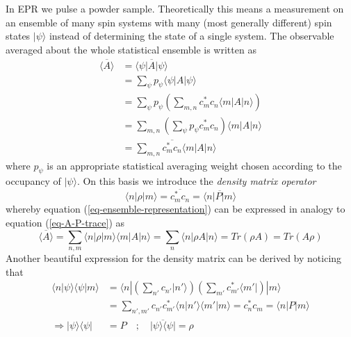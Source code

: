 \documentclass[11.5pt,a4paper]{article}
\begin{document}
In EPR we pulse a powder sample. Theoretically this means a measurement on an ensemble of many spin systems with many (most generally different) spin states $|\psi\rangle$ instead of determining the state of a single system. The observable averaged about the whole statistical ensemble is written as
\begin{align}
 \overline{\langle A \rangle} & = \overline{\langle \psi | A | \psi \rangle} \\
  & = \sum_\psi p_\psi \langle \psi | A | \psi \rangle \\ 
  & = \sum_\psi p_\psi \left( \sum_{m,n} c_m^* c_n \langle m | A | n \rangle \right) \\
  & = \sum_{m,n} \left( \sum_\psi p_\psi c_m^* c_n \right) \langle m | A | n \rangle \\
  & = \sum_{m,n} \overline{c_m^* c_n} \langle m | A | n \rangle
  \label{eq-ensemble-representation}
\end{align}
where $p_\psi$ is an appropriate statistical averaging weight chosen according to the occupancy of $|\psi\rangle$. On this basis we introduce the \emph{density matrix operator}
\begin{equation} 
 \langle n | \rho | m \rangle = \overline{c_m^* c_n} = \overline{\langle n | P | m \rangle}
\end{equation}
whereby equation (\ref{eq-ensemble-representation}) can be expressed in analogy to equation (\ref{eq-A-P-trace}) as
\begin{equation}
 \overline{\langle A \rangle} = \sum_{n,m} \langle n | \rho | m \rangle \langle m | A | n \rangle = \sum_{n} \langle n | \rho A | n \rangle = Tr(\rho A) = Tr(A \rho)
\end{equation}
Another beautiful expression for the density matrix can be derived by noticing that
\begin{align}
 \langle n |\psi \rangle \langle \psi | m \rangle & = \langle n | \left( \sum_{n'} c_{n'} |n' \rangle \right) \left( \sum_{m'} c_{m'}^* \langle m' | \right) | m \rangle \\ & = \sum_{n',m'} c_{n'} c_{m'}^* \langle n | n' \rangle \langle m' | m \rangle = c_n^* c_m  = \langle n | P | m \rangle \\
  \Rightarrow |\psi\rangle\langle\psi| & = P \quad; \quad \overline{|\psi\rangle\langle\psi|}  = \rho
\label{eq-density-matrix}
\end{align}
\end{document}
